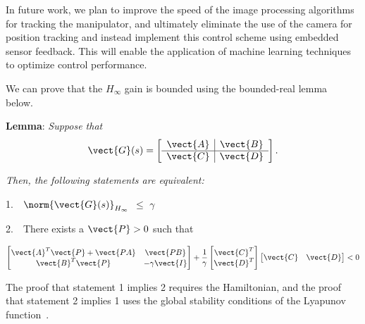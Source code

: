 In future work, we plan to improve the speed of the image processing algorithms for tracking the manipulator, and ultimately eliminate the use of the camera for position tracking and instead implement this control scheme using embedded sensor feedback.  This will enable the application of machine learning techniques to optimize control performance.

\appendix
We can prove that the ${H_{\infty}}$ gain is bounded using the bounded-real lemma~\cite{boyd1994} below. 

\textbf{Lemma}: \textit{Suppose that}
\begin{equation*}
\vect{G}(s)=\begin{bmatrix}
\begin{array}{c | c}
\vect{A}  &  \vect{B} \\
\hline
\vect{C}  & \vect{D}
\end{array}  
\end{bmatrix}.
\end{equation*}

\textit{Then, the following statements are equivalent:} 

1.~~$\norm{\vect{G}(s)}_{H_{\infty}}$ $\leq$ $\gamma$ \vspace{1mm}
    
2.~~There exists a $\vect{P} > 0$ such that 

    \begin{equation*}
		\begin{bmatrix}
		\vect{A}^T\vect{P}+\vect{PA} &  \vect{PB} \\
		\vect{B}^T\vect{P}    & -\gamma \vect{I} \\
		\end{bmatrix}+\dfrac{1}{\gamma}	\begin{bmatrix}
		\vect{C}^T\\
		\vect{D}^T\\
		\end{bmatrix}\begin{bmatrix}
		\vect{C} & \vect{D}\\
		\end{bmatrix} < 0
		\label{eq-LMI}
		\end{equation*}

The proof that statement 1 implies 2 requires the Hamiltonian, and the proof that statement 2 implies 1 uses the global stability conditions of the Lyapunov function~\cite{boyd1994}.
